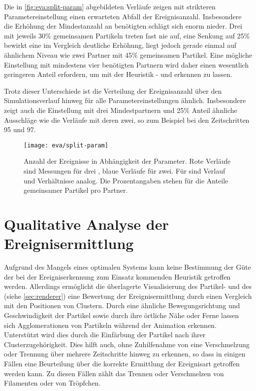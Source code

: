 Die in \autoref{fig:eva:split-param} abgebildeten Verläufe zeigen mit strikteren Parametereinstellung einen erwarteten Abfall der Ereignisanzahl. Insbesondere die Erhöhung der Mindestanzahl an benötigten  schlägt sich enorm nieder. Drei  mit jeweils 30\% gemeinsamen Partikeln treten fast nie auf, eine Senkung auf 25\% bewirkt eine im Vergleich deutliche Erhöhung, liegt jedoch gerade einmal auf ähnlichem Niveau wie zwei Partner mit 45\% gemeinsamen Partikel. Eine mögliche Einstellung mit mindestens vier benötigten Partnern wird daher einen wesentlich geringeren Anteil erfordern, um mit der Heuristik - und  erkennen zu lassen.

Trotz dieser Unterschiede ist die Verteilung der Ereignisanzahl über den Simulationsverlauf hinweg für alle Parametereinstellungen ähnlich. Insbesondere zeigt auch die Einstellung mit drei Mindestpartnern und 25\% Anteil ähnliche Ausschläge wie die Verläufe mit deren zwei, so zum Beispiel bei den Zeitschritten 95 und 97.

\begin{figure}
	\texttt{[image: eva/split-param]}
	\caption{Anzahl der Ereignisse in Abhängigkeit der Parameter. Rote Verläufe sind Messungen für drei , blaue Verläufe für zwei. Für  sind Verlauf und Verhältnisse analog. Die Prozentangaben stehen für die Anteile gemeinsamer Partikel pro Partner.}\label{fig:eva:split-param}
\end{figure}

\section{Qualitative Analyse der Ereignisermittlung}\label{sec:eva:ereignisse}

Aufgrund des Mangels eines optimalen Systems kann keine Bestimmung der Güte der bei der Ereigniserkennung zum Einsatz kommenden Heuristik getroffen werden. Allerdings ermöglicht die überlagerte Visualisierung des Partikel- und des  (siehe \autoref{sec:renderer}) eine Bewertung der Ereignisermittlung durch einen Vergleich mit den Positionen von Clustern. Durch eine ähnliche Bewegungsrichtung und Geschwindigkeit der Partikel sowie durch ihre örtliche Nähe oder Ferne lassen sich Agglomerationen von Partikeln während der Animation erkennen. Unterstützt wird dies durch die Einfärbung der Partikel nach ihrer Clusterzugehörigkeit. Dies hilft auch, ohne Zuhilfenahme von  eine Verschmelzung oder Trennung über mehrere Zeitschritte hinweg zu erkennen, so dass in einigen Fällen eine Beurteilung über die korrekte Ermittlung der Ereignisart getroffen werden kann. Zu diesen Fällen zählt das Trennen oder Verschmelzen von Filamenten oder von Tröpfchen.

